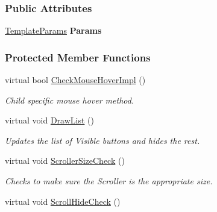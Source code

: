 \subsubsection*{Public Attributes}
\begin{DoxyCompactItemize}
\item 
\hypertarget{classMezzanine_1_1UI_1_1ListBox_a910fdad48b474cf8d8d5b46832f412d1}{
\hyperlink{structMezzanine_1_1UI_1_1TemplateParams}{TemplateParams} {\bfseries Params}}
\label{classMezzanine_1_1UI_1_1ListBox_a910fdad48b474cf8d8d5b46832f412d1}

\end{DoxyCompactItemize}
\subsubsection*{Protected Member Functions}
\begin{DoxyCompactItemize}
\item 
\hypertarget{classMezzanine_1_1UI_1_1ListBox_abc5d9bc871a42788cd2c64f91663513e}{
virtual bool \hyperlink{classMezzanine_1_1UI_1_1ListBox_abc5d9bc871a42788cd2c64f91663513e}{CheckMouseHoverImpl} ()}
\label{classMezzanine_1_1UI_1_1ListBox_abc5d9bc871a42788cd2c64f91663513e}

\begin{DoxyCompactList}\small\item\em Child specific mouse hover method. \item\end{DoxyCompactList}\item 
\hypertarget{classMezzanine_1_1UI_1_1ListBox_a59322b6ee0e6aa017e9b878f677d3154}{
virtual void \hyperlink{classMezzanine_1_1UI_1_1ListBox_a59322b6ee0e6aa017e9b878f677d3154}{DrawList} ()}
\label{classMezzanine_1_1UI_1_1ListBox_a59322b6ee0e6aa017e9b878f677d3154}

\begin{DoxyCompactList}\small\item\em Updates the list of Visible buttons and hides the rest. \item\end{DoxyCompactList}\item 
\hypertarget{classMezzanine_1_1UI_1_1ListBox_a352816786d0688c7522c1c5ffdadd416}{
virtual void \hyperlink{classMezzanine_1_1UI_1_1ListBox_a352816786d0688c7522c1c5ffdadd416}{ScrollerSizeCheck} ()}
\label{classMezzanine_1_1UI_1_1ListBox_a352816786d0688c7522c1c5ffdadd416}

\begin{DoxyCompactList}\small\item\em Checks to make sure the Scroller is the appropriate size. \item\end{DoxyCompactList}\item 
\hypertarget{classMezzanine_1_1UI_1_1ListBox_ab66f2d1e50943a19f1c125237ee0af62}{
virtual void \hyperlink{classMezzanine_1_1UI_1_1ListBox_ab66f2d1e50943a19f1c125237ee0af62}{ScrollHideCheck} ()}
\label{classMezzanine_1_1UI_1_1ListBox_ab66f2d1e50943a19f1c125237ee0af62}


\end{DoxyCompactItemize}
